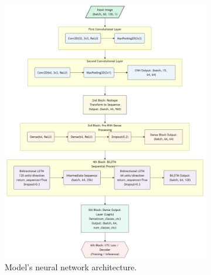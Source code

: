 \documentclass[11pt,letterpaper]{article}
\begin{document}
	\begin{figure}[h]
		\centering
		\begin{subfigure}[b]{0.58\linewidth}
			\centering
			\includegraphics[width=\linewidth]{network_architecture_v2.png}
			\caption{Model's neural network architecture.}
			\label{fig:net_architecture}
		\end{subfigure}
		\hfill
		\begin{subfigure}[b]{0.38\linewidth}
			\centering

\end{subfigure}
\end{figure}
\end{document}

